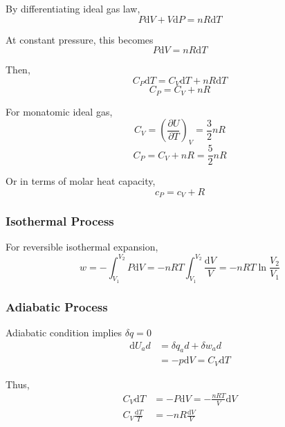\documentclass[letterpaper]{article}
\newcommand{\diff}{\mathrm{d}}
\begin{document}
By differentiating ideal gas law,
\begin{equation*}
    P\diff V+V\diff P=nR\diff T
\end{equation*}

At constant pressure, this becomes
\begin{equation*}
    P\diff V=nR\diff T
\end{equation*}

Then,
\begin{equation*}
    C_P\diff T=C_V\diff T+nR\diff T
\end{equation*}
\begin{equation*}
    \boxed{C_P=C_V+nR}
\end{equation*}

For monatomic ideal gas,
\begin{equation*}
    C_V=\left(\frac{\partial U}{\partial T}\right)_V=\frac{3}{2}nR
\end{equation*}
\begin{equation*}
    C_P=C_V+nR=\frac{5}{2}nR
\end{equation*}

Or in terms of molar heat capacity,
\begin{equation*}
    c_P=c_V+R
\end{equation*}
\subsubsection*{Isothermal Process}
For reversible isothermal expansion,
\begin{equation*}
    w=-\int_{V_1}^{V_2}P\diff V=-nRT\int_{V_1}^{V_2}\frac{\diff V}{V}=-nRT\ln\frac{V_2}{V_1}
\end{equation*}
\subsubsection*{Adiabatic Process}
Adiabatic condition implies $\delta q=0$
\begin{equation*}
    \begin{aligned}
        \diff U_ad & =\delta q_ad + \delta w_ad \\
                   & =-p\diff V=C_V\diff T
    \end{aligned}
\end{equation*}

Thus,
\begin{equation*}
    \begin{aligned}
        C_V\diff T           & =-P\diff V=-\frac{nRT}{V}\diff V \\
        C_V\frac{\diff T}{T} & =-nR\frac{\diff V}{V}
    \end{aligned}
\end{equation*}
\end{document}
